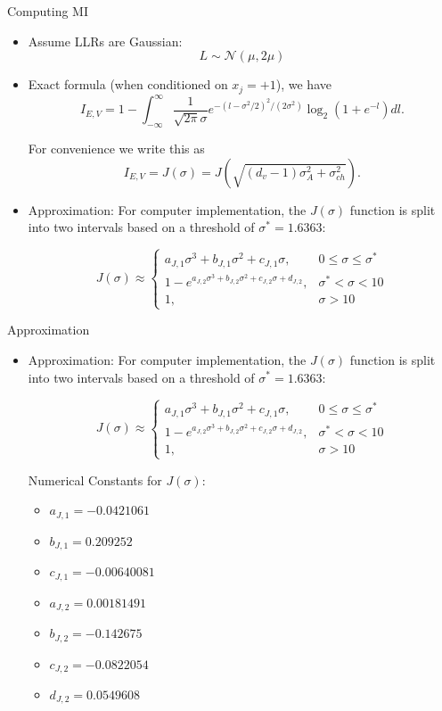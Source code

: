 \documentclass{beamer}
\begin{document}
\begin{frame}{Computing MI}
\begin{itemize}
    \item Assume LLRs are Gaussian:
    \[
    L \sim \mathcal{N}(\mu, 2\mu)
    \] 
    \item Exact formula (when conditioned on $x_j = +1$), we have
$$I_{E,V} = 1 - \int_{-\infty}^{\infty} \frac{1}{\sqrt{2\pi}\sigma} e^{-(l-\sigma^2/2)^2/(2\sigma^2)} \log_2(1+e^{-l}) dl. $$

For convenience we write this as
$$I_{E,V} = J(\sigma) = J\left(\sqrt{(d_v-1)\sigma_A^2 + \sigma_{ch}^2}\right). $$
        \item Approximation: 
For computer implementation, the $J(\sigma)$ function is split into two intervals based on a threshold of $\sigma^* = 1.6363$:

$$J(\sigma) \approx \begin{cases} 
a_{J,1} \sigma^3 + b_{J,1} \sigma^2 + c_{J,1} \sigma, & 0 \leq \sigma \leq \sigma^* \\
1 - e^{a_{J,2} \sigma^3 + b_{J,2} \sigma^2 + c_{J,2} \sigma + d_{J,2}}, & \sigma^* < \sigma < 10 \\
1, & \sigma > 10 
\end{cases}$$

\end{itemize}
\end{frame}


\begin{frame}{Approximation}
\begin{itemize}

        \item Approximation: 
For computer implementation, the $J(\sigma)$ function is split into two intervals based on a threshold of $\sigma^* = 1.6363$:

$$J(\sigma) \approx \begin{cases} 
a_{J,1} \sigma^3 + b_{J,1} \sigma^2 + c_{J,1} \sigma, & 0 \leq \sigma \leq \sigma^* \\
1 - e^{a_{J,2} \sigma^3 + b_{J,2} \sigma^2 + c_{J,2} \sigma + d_{J,2}}, & \sigma^* < \sigma < 10 \\
1, & \sigma > 10 
\end{cases}$$

Numerical Constants for $J(\sigma)$:
\begin{itemize}
    \item $a_{J,1} = -0.0421061$
    \item $b_{J,1} = 0.209252$
    \item $c_{J,1} = -0.00640081$
    \item $a_{J,2} = 0.00181491$
    \item $b_{J,2} = -0.142675$
    \item $c_{J,2} = -0.0822054$
    \item $d_{J,2} = 0.0549608$
\end{itemize}
\end{itemize}
\end{frame}
\end{document}
